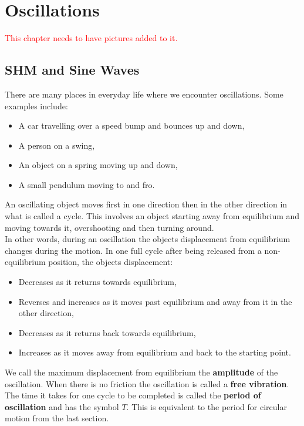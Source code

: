 \chapter{Oscillations}
\textcolor{red}{This chapter needs to have pictures added to it.}
\section{SHM and Sine Waves}

There are many places in everyday life where we encounter oscillations. Some examples include:
\begin{itemize}
\setlength{\itemsep}{-5pt}
    \item A car travelling over a speed bump and bounces up and down,
    \item A person on a swing,
    \item An object on a spring moving up and down,
    \item A small pendulum moving to and fro.
\end{itemize} 

An oscillating object moves first in one direction then in the other direction in what is called a cycle. This involves an object starting away from equilibrium and moving towards it, overshooting and then turning around.\\

In other words, during an oscillation the objects displacement from equilibrium changes during the motion. In one full cycle after being released from a non-equilibrium position, the objects displacement:
\begin{itemize}
\setlength{\itemsep}{-5pt}
    \item Decreases as it returns towards equilibrium,
    \item Reverses and increases as it moves past equilibrium and away from it in the other direction,
    \item Decreases as it returns back towards equilibrium,
    \item Increases as it moves away from equilibrium and back to the starting point.
\end{itemize} 

We call the maximum displacement from equilibrium the \textbf{amplitude} of the oscillation. When there is no friction the oscillation is called a \textbf{free vibration}. The time it takes for one cycle to be completed is called the \textbf{period of oscillation} and has the symbol $T$. This is equivalent to the period for circular motion from the last section. \\

